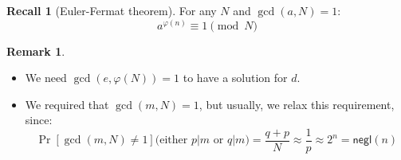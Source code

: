 \documentclass[11pt]{article}
\theoremstyle{definition}
\newtheorem{remark}{Remark}[section]
\newtheorem{recall}{Recall}[section]
\theoremstyle{proof}
\newcommand{\negl}{\mathsf{negl}}
\begin{document}
\begin{recall}[Euler-Fermat theorem]
	\leavevmode
	For any $N$ and $\gcd(a, N) = 1$:
	$$
	a^{\varphi(n)} \equiv 1 \pmod{N}
	$$
\end{recall}

\begin{remark}
	\leavevmode
	\begin{itemize}
		\item We need $\gcd(e, \varphi(N)) = 1$ to have a solution for $d$.
		\item We required that $\gcd(m, N) = 1$, but usually, we relax this requirement, since:
		$$
		\Pr[\gcd(m, N) \ne 1] \text{(either $p|m$ or $q|m$)} = \frac{q+p}{N} \approx \frac{1}{p} \approx 2^n = \negl(n)
		$$
	\end{itemize}
\end{remark}
\end{document}
